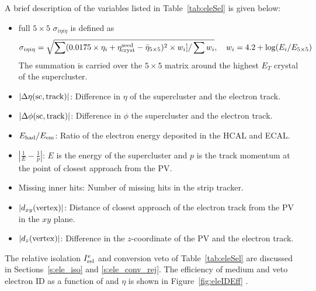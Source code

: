 A brief description of the variables listed in Table~\ref{tab:eleSel} is given below:
\begin{itemize}
    \item full $5\times 5$ $\sigma_{i\eta i\eta}$ is defined as~\cite{Khachatryan:2015hwa} 
    \begin{equation}
    \sigma_{i\eta i\eta}=\sqrt{\sum(0.0175\times\eta_i+\eta^{\rm seed}_{\rm cryst}-\bar{\eta}_{5\times 5})^2\times w_i]/\sum w_i}, \quad w_i = 4.2 + \log(E_i/E_{5\times 5})
    \label{eq:sIeIe}
    \end{equation}
    The summation is carried over the $5\times 5$ matrix around the highest $E_T$ crystal of the supercluster.
    \item $|\Delta\eta({\rm sc},{\rm track})|$: Difference in $\eta$ of the supercluster and the electron track.
    \item $|\Delta\phi({\rm sc},{\rm track})|$: Difference in $\phi$ the supercluster and the electron track.
    \item $E_{\rm had}/E_{\rm em}$: Ratio of the electron energy deposited in the HCAL and ECAL.
    \item $|\frac{1}{E}-\frac{1}{p}|$: $E$ is the energy of the supercluster and $p$ is the track momentum at
    the point of closest approach from the PV.
    \item Missing inner hits: Number of missing hits in the strip tracker.
    \item $|d_{xy}({\rm vertex})|$: Distance of closest approach of the electron track from the PV in the $xy$ plane.
    \item $|d_{z}({\rm vertex})|$: Difference in the $z$-coordinate of the PV and the electron track.
\end{itemize}
The relative isolation $I_{\rm rel}^e$ and conversion veto of Table~\ref{tab:eleSel}
are discussed in Sections~\ref{s:ele_iso} and \ref{s:ele_conv_rej}. The efficiency of medium and 
veto electron ID as a function of \pt and $\eta$ is shown in Figure~\ref{fig:eleIDEff} \cite{eleSF}.
